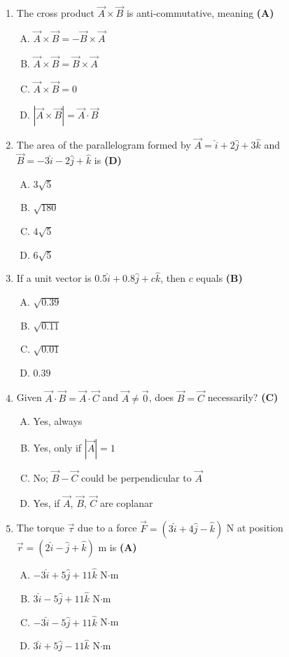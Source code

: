 \documentclass[10pt,a4paper]{article}
\begin{document}
\begin{enumerate}[1.]
\item The cross product $\vec{A} \times \vec{B}$ is anti-commutative, meaning \hfill \textbf{(A)}
\begin{enumerate}[(A)]
    \item $\vec{A} \times \vec{B} = -\vec{B} \times \vec{A}$
    \item $\vec{A} \times \vec{B} = \vec{B} \times \vec{A}$
    \item $\vec{A} \times \vec{B} = 0$
    \item $|\vec{A} \times \vec{B}| = \vec{A} \cdot \vec{B}$
\end{enumerate}

\item The area of the parallelogram formed by $\vec{A} = \hat{i}+2\hat{j}+3\hat{k}$ and $\vec{B} = -3\hat{i}-2\hat{j}+\hat{k}$ is \hfill \textbf{(D)}
\begin{enumerate}[(A)]
    \item $3\sqrt{5}$
    \item $\sqrt{180}$
    \item $4\sqrt{5}$
    \item $6\sqrt{5}$
\end{enumerate}

\item If a unit vector is $0.5\hat{i} + 0.8\hat{j} + c\hat{k}$, then $c$ equals \hfill \textbf{(B)}
\begin{enumerate}[(A)]
    \item $\sqrt{0.39}$
    \item $\sqrt{0.11}$
    \item $\sqrt{0.01}$
    \item $0.39$
\end{enumerate}

\item Given $\vec{A}\cdot\vec{B} = \vec{A}\cdot\vec{C}$ and $\vec{A} \neq \vec{0}$, does $\vec{B} = \vec{C}$ necessarily? \hfill \textbf{(C)}
\begin{enumerate}[(A)]
    \item Yes, always
    \item Yes, only if $|\vec{A}|=1$
    \item No; $\vec{B}-\vec{C}$ could be perpendicular to $\vec{A}$
    \item Yes, if $\vec{A}$, $\vec{B}$, $\vec{C}$ are coplanar
\end{enumerate}

\item The torque $\vec{\tau}$ due to a force $\vec{F} = (3\hat{i}+4\hat{j}-\hat{k})$ N at position $\vec{r} = (2\hat{i}-\hat{j}+\hat{k})$ m is \hfill \textbf{(A)}
\begin{enumerate}[(A)]
    \item $-3\hat{i}+5\hat{j}+11\hat{k}$ N$\cdot$m
    \item $3\hat{i}-5\hat{j}+11\hat{k}$ N$\cdot$m
    \item $-3\hat{i}-5\hat{j}+11\hat{k}$ N$\cdot$m
    \item $3\hat{i}+5\hat{j}-11\hat{k}$ N$\cdot$m
\end{enumerate}


\end{enumerate}
\end{document}
